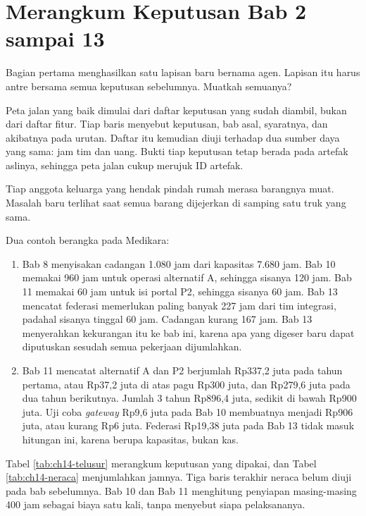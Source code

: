 \section{Merangkum Keputusan Bab 2 sampai 13}

Bagian pertama menghasilkan satu lapisan baru bernama agen. Lapisan itu harus antre bersama semua keputusan sebelumnya. Muatkah semuanya?

Peta jalan yang baik dimulai dari daftar keputusan yang sudah diambil, bukan dari daftar fitur. Tiap baris menyebut keputusan, bab asal, syaratnya, dan akibatnya pada urutan. Daftar itu kemudian diuji terhadap dua sumber daya yang sama: jam tim dan uang. Bukti tiap keputusan
tetap berada pada artefak aslinya, sehingga peta jalan cukup merujuk ID artefak.

Tiap anggota keluarga yang hendak pindah rumah merasa barangnya muat. Masalah baru terlihat saat semua barang dijejerkan di samping satu truk yang sama.

Dua contoh berangka pada Medikara:
\begin{enumerate}
  \item Bab 8 menyisakan cadangan 1.080 jam dari kapasitas 7.680 jam. Bab 10 memakai 960 jam untuk operasi alternatif A, sehingga sisanya 120 jam. Bab 11 memakai 60 jam untuk isi portal P2, sehingga sisanya 60 jam. Bab 13 mencatat federasi memerlukan paling banyak 227 jam dari tim integrasi,
        padahal sisanya tinggal 60 jam. Cadangan kurang 167 jam. Bab 13 menyerahkan kekurangan itu ke bab ini, karena apa yang digeser baru dapat diputuskan sesudah semua pekerjaan dijumlahkan.
  \item Bab 11 mencatat alternatif A dan P2 berjumlah Rp337,2 juta pada tahun pertama, atau Rp37,2 juta di atas pagu Rp300 juta, dan Rp279,6 juta pada dua tahun berikutnya. Jumlah 3 tahun Rp896,4 juta, sedikit di bawah Rp900 juta. Uji coba \textit{gateway} Rp9,6 juta pada Bab 10 membuatnya menjadi Rp906 juta, atau
        kurang Rp6 juta. Federasi Rp19,38 juta pada Bab 13 tidak masuk hitungan ini, karena berupa kapasitas, bukan kas.
\end{enumerate}

Tabel \ref{tab:ch14-telusur} merangkum keputusan yang dipakai, dan Tabel \ref{tab:ch14-neraca} menjumlahkan jamnya. Tiga baris terakhir neraca belum diuji pada bab sebelumnya. Bab 10 dan Bab 11 menghitung penyiapan masing-masing 400 jam sebagai biaya satu kali, tanpa menyebut siapa pelaksananya.

